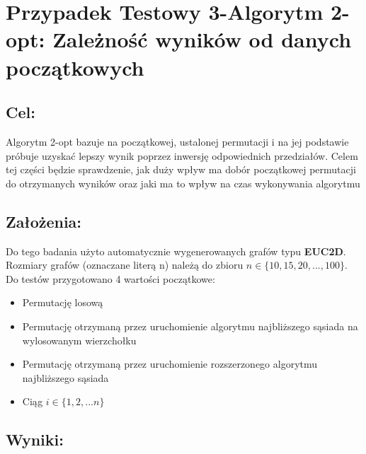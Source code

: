 \section{Przypadek Testowy 3-Algorytm 2-opt: Zależność wyników od danych początkowych}
	\subsection{Cel:}
    Algorytm 2-opt bazuje na początkowej, ustalonej permutacji i na jej podstawie próbuje uzyskać lepszy wynik poprzez inwersję odpowiednich przedziałów. Celem tej części będzie sprawdzenie, jak duży wpływ ma dobór początkowej permutacji do otrzymanych wyników oraz jaki ma to wpływ na czas wykonywania algorytmu

  \subsection{Założenia:}
    Do tego badania użyto automatycznie wygenerowanych grafów typu \textbf{EUC2D}. Rozmiary grafów (oznaczane literą n) należą do zbioru $n \in \{10,15,20,...,100\}$. Do testów przygotowano 4 wartości początkowe:
    \begin{itemize}
      \item Permutację losową
      \item Permutację otrzymaną przez uruchomienie algorytmu najbliższego sąsiada na wylosowanym wierzchołku
      \item Permutację otrzymaną przez uruchomienie rozszerzonego algorytmu najbliższego sąsiada
      \item Ciąg $i \in \{1,2,...n\} $
    \end{itemize}
  \subsection{Wyniki: }

